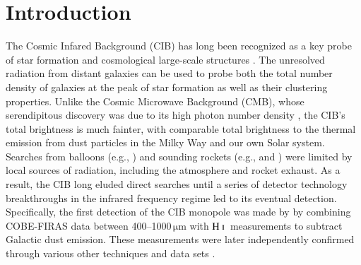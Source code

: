 \documentclass{aa}
\newcommand{\mathsc}[1]{{\normalfont\textsc{#1}}}
\newcommand{\hi}{\ensuremath{\mathsc {H\ i}}}
\begin{document}

   \maketitle

   \setcounter{tocdepth}{2}
   \tableofcontents


\section{Introduction}


The Cosmic Infared Background (CIB) has long been recognized as a key probe of star formation and cosmological large-scale structures \citep{partridge1967}. The unresolved radiation from distant galaxies can be used to probe both the total number density of galaxies at the peak of star formation as well as their clustering properties. Unlike the Cosmic Microwave Background (CMB), whose serendipitous discovery was due to its high photon number density \citep{penzias:1965}, the CIB's total brightness is much fainter, with comparable total brightness to the thermal emission from dust particles in the Milky Way and our own Solar system. 
Searches from balloons (e.g., \citealt{hofmann1978}) and sounding rockets (e.g., \citealt{matsumoto1988} and \citealt{noda1992}) were limited by local sources of radiation, including the atmosphere and rocket exhaust.
As a result, the CIB long eluded direct searches until a series of detector technology breakthroughs in the infrared frequency regime led to its eventual detection. Specifically, the first detection of the CIB monopole was made by \citet{puget1996} by combining COBE-FIRAS data between 400--1000\,$\mathrm{\mu m}$ with \hi\ measurements to subtract Galactic dust emission. These measurements were later independently confirmed through various other techniques and data sets \citep[e.g.,][]{fixsen1998, schlegel1998, lagache:1999, matsumoto:2005, matsuura:2011, penin:2012, tsumura:2013, matsuura:2017}.
\end{document}
